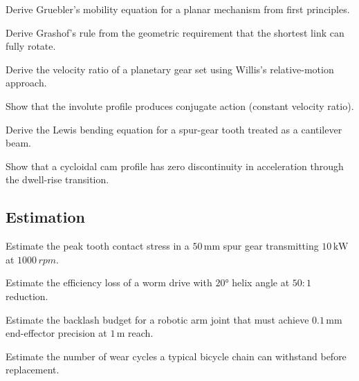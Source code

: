 \begin{exercise}
Derive Gruebler's mobility equation for a planar mechanism from first principles.
\end{exercise}

\begin{exercise}
Derive Grashof's rule from the geometric requirement that the shortest link can fully rotate.
\end{exercise}

\begin{exercise}
Derive the velocity ratio of a planetary gear set using Willis's relative-motion approach.
\end{exercise}

\begin{exercise}
Show that the involute profile produces conjugate action (constant velocity ratio).
\end{exercise}

\begin{exercise}
Derive the Lewis bending equation for a spur-gear tooth treated as a cantilever beam.
\end{exercise}

\begin{exercise}
Show that a cycloidal cam profile has zero discontinuity in acceleration through the dwell-rise transition.
\end{exercise}

\subsection*{Estimation}

\begin{exercise}
Estimate the peak tooth contact stress in a $50\,\si{\milli\meter}$ spur gear transmitting $10\,\si{\kilo\watt}$ at $1000\,\si{rpm}$.
\end{exercise}

\begin{exercise}
Estimate the efficiency loss of a worm drive with $20°$ helix angle at $50:1$ reduction.
\end{exercise}

\begin{exercise}
Estimate the backlash budget for a robotic arm joint that must achieve $0.1\,\si{\milli\meter}$ end-effector precision at $1\,\si{\meter}$ reach.
\end{exercise}

\begin{exercise}
Estimate the number of wear cycles a typical bicycle chain can withstand before replacement.
\end{exercise}

